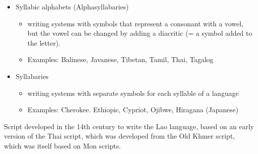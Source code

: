 \documentclass[a4paper,landscape,headrule,footrule,xetex]{foils}
\begin{document}


\MyLogo{}
\begin{itemize}
\item Syllabic alphabets (Alphasyllabaries)
\begin{itemize}
\item writing systems with symbols that represent a consonant with a
  vowel, but the vowel can be changed by adding a diacritic (= a
  symbol added to the letter).
\item Examples: Balinese, Javanese, Tibetan, Tamil, Thai, Tagalog
\end{itemize}
\item Syllabaries
\begin{itemize}
\item writing systems with separate symbols for each syllable of a language
\item Examples: Cherokee. Ethiopic, Cypriot, Ojibwe, Hiragana (Japanese)
\end{itemize}
\end{itemize}








 Script developed in the 14th
century to write the Lao language, based on an early version of the
Thai script, which was developed from the Old Khmer script, which was
itself based on Mon scripts.
\end{document}
